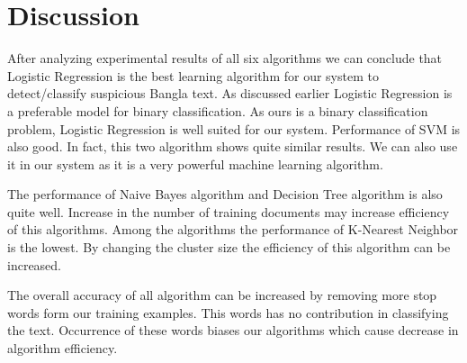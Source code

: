 \section{Discussion}

After analyzing experimental results of all six algorithms we can conclude that Logistic Regression is the best learning algorithm for our system to detect/classify suspicious Bangla text. As discussed earlier Logistic Regression is a preferable model for binary classification. As ours is a binary classification problem, Logistic Regression is well suited for  our system. Performance of SVM is also good. In fact, this two algorithm shows quite similar results. We can also use it in our system as it is a very powerful machine learning algorithm.
\par 
\vspace{0.5cm}
\noindent
The performance of Naive Bayes algorithm and Decision Tree algorithm is also quite well. Increase in the number of training documents may increase efficiency of this algorithms. Among the algorithms the performance of K-Nearest Neighbor is the lowest. By changing the cluster size the efficiency of this algorithm can be increased.
\par 
\vspace{0.5cm}
\noindent
The overall accuracy of all algorithm can be increased by removing more stop words form our training examples. This words has no contribution in classifying the text. Occurrence of these words biases our algorithms which cause decrease in algorithm efficiency.  